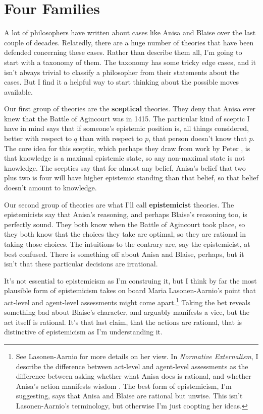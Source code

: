 \documentclass[11pt,]{book}
\let\rmarkdownfootnote\footnote%
\def\footnote{\protect\rmarkdownfootnote}
\begin{document}
\hypertarget{fourfamilies}{%
\section{Four Families}\label{fourfamilies}}

A lot of philosophers have written about cases like Anisa and Blaise over the last couple of decades. Relatedly, there are a huge number of theories that have been defended concerning these cases. Rather than describe them all, I'm going to start with a taxonomy of them. The taxonomy has some tricky edge cases, and it isn't always trivial to classify a philosopher from their statements about the cases. But I find it a helpful way to start thinking about the possible moves available.

Our first group of theories are the \textbf{sceptical} theories. They deny that Anisa ever knew that the Battle of Agincourt was in 1415. The particular kind of sceptic I have in mind says that if someone's epistemic position is, all things considered, better with respect to \(q\) than with respect to \(p\), that person doesn't know that \(p\). The core idea for this sceptic, which perhaps they draw from work by Peter \citet{Unger1975}, is that knowledge is a maximal epistemic state, so any non-maximal state is not knowledge. The sceptics say that for almost any belief, Anisa's belief that two plus two is four will have higher epistemic standing than that belief, so that belief doesn't amount to knowledge.

Our second group of theories are what I'll call \textbf{epistemicist} theories. The epistemicists say that Anisa's reasoning, and perhaps Blaise's reasoning too, is perfectly sound. They both know when the Battle of Agincourt took place, so they both know that the choices they take are optimal, so they are rational in taking those choices. The intuitions to the contrary are, say the epistemicist, at best confused. There is something off about Anisa and Blaise, perhaps, but it isn't that these particular decisions are irrational.

It's not essential to epistemicism as I'm construing it, but I think by far the most plausible form of epistemicism takes on board Maria Lasonen-Aarnio's point that act-level and agent-level assessments might come apart.\footnote{See Lasonen-Aarnio \citetext{\citeyear{Lasonen-Aarnio2010b}; \citeyear{Lasonen-Aarnio2014}} for more details on her view. In \emph{Normative Externalism}, I describe the difference between act-level and agent-level assessments as the difference between asking whether what Anisa does is rational, and whether Anisa's action manifests wisdom \citep[124-5]{Weatherson2019}. The best form of epistemicism, I'm suggesting, says that Anisa and Blaise are rational but unwise. This isn't Lasonen-Aarnio's terminology, but otherwise I'm just coopting her ideas.} Taking the bet reveals something bad about Blaise's character, and arguably manifests a vice, but the act itself is rational. It's that last claim, that the actions are rational, that is distinctive of epistemicism as I'm understanding it.
\end{document}
